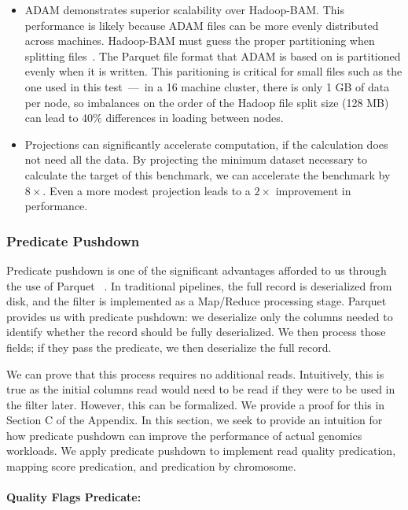\documentclass{acm_proc_article-sp}
\begin{document}
\begin{itemize}
\item ADAM demonstrates superior scalability over Hadoop-BAM. This performance is likely because ADAM files can be more evenly distributed across machines.
Hadoop-BAM must guess the proper partitioning when splitting files~\cite{niemenmaa12}. The Parquet file format that ADAM is based on is partitioned
evenly when it is written\cite{parquet}. This paritioning is critical for small files such as the one used in this test~---~in a 16 machine cluster, there is only 1 GB of
data per node, so imbalances on the order of the Hadoop file split size (128 MB) can lead to 40\% differences in loading between nodes.
\item Projections can significantly accelerate computation, if the calculation does not need all the data. By projecting the minimum dataset necessary
to calculate the target of this benchmark, we can accelerate the benchmark by $8\times$. Even a more modest projection leads to a $2\times$
improvement in performance.
\end{itemize}

\subsubsection{Predicate Pushdown}
\label{sec:predicate-pushdown}

Predicate pushdown is one of the significant advantages afforded to us through the use of Parquet	~\cite{parquet}. In traditional
pipelines, the full record is deserialized from disk, and the filter is implemented as a Map/Reduce processing stage. Parquet provides
us with predicate pushdown: we deserialize only the columns needed to identify whether the record should be fully deserialized. We
then process those fields; if they pass the predicate, we then deserialize the full record.

We can prove that this process requires no additional reads. Intuitively, this is true as the initial columns read would need to be read
if they were to be used in the filter later. However, this can be formalized. We provide a proof for this in Section C of the Appendix.
In this section, we seek to provide an intuition for how predicate pushdown can improve the performance of actual genomics workloads.
We apply predicate pushdown to implement read quality predication, mapping score predication, and predication by chromosome. 

\paragraph{Quality Flags Predicate:}
\label{sec:quality-flags-predicate}
\end{document}
